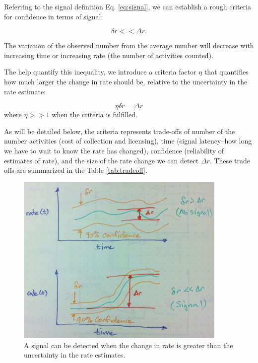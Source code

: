 \documentclass{article}
\begin{document}
Referring to the signal definition Eq. \ref{eq:signal}, we can establish a rough criteria for confidence in terms of signal: 

\begin{equation}
    \label{eq:criteria}
    \delta r << \Delta r.
\end{equation}

The variation of the observed number from the average number will decrease with increasing time or increasing rate (the number of activities counted).

The help quantify this inequality, we introduce a criteria factor $\eta$ that quantifies how much larger the change in rate should be, relative to the uncertainty in the rate estimate:

\begin{equation}
    \label{eq:criteriaParam}
    \eta \delta r = \Delta r
\end{equation}
where $\eta >> 1$ when the criteria is fulfilled.

As will be detailed below, the criteria represents trade-offs of number of the number activities (cost of collection and licensing), time (signal latency--how long we have to wait to know the rate has changed), confidence (reliability of estimates of rate), and the size of the rate change we can detect $\Delta r$. These trade offs are summarized in the Table \ref{tab:tradeoff}.


%
\begin{figure}[h]
    \centering
    \includegraphics[width=4.0in]{./imgs/signal.jpg}
        \caption{A signal can be detected when the change in rate is greater than the uncertainty in the rate estimates.}
    \label{fig:signal}
\end{figure}
%
%
\end{document}
